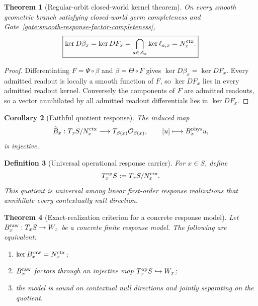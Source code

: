 \documentclass[11pt]{article}
\newtheorem{theorem}{Theorem}[section]
\newtheorem{corollary}[theorem]{Corollary}
\newtheorem{definition}[theorem]{Definition}
\theoremstyle{remark}
\begin{document}
\begin{theorem}[Regular-orbit closed-world kernel theorem]
\label{thm:regular-stratum-closed-world-kernel}
On every smooth geometric branch satisfying closed-world germ completeness and
Gate~\ref{gate:smooth-response-factor-completeness},
\[
\boxed{
\ker D\beta_x
=\ker DF_x
=\bigcap_{a\in\mathcal A_x}\ker\ell_{a,x}
=N_x^{\rm ctx}.}
\]
\end{theorem}

\begin{proof}
Differentiating $F=\Psi\circ\beta$ and $\beta=\Theta\circ F$ gives
$\ker D\beta_x=\ker DF_x$.  Every admitted readout is locally a smooth
function of $F$, so $\ker DF_x$ lies in every admitted readout kernel.
Conversely the components of $F$ are admitted readouts, so a vector
annihilated by all admitted readout differentials lies in $\ker DF_x$.
\end{proof}

\begin{corollary}[Faithful quotient response]
\label{cor:faithful-quotient-response}
The induced map
\[
 \widetilde B_x:T_xS/N_x^{\rm ctx}
 \longrightarrow T_{\beta(x)}\mathcal O_{\beta(x)},
 \qquad [u]\longmapsto B_x^{\rm phys}u,
\]
is injective.
\end{corollary}

\begin{definition}[Universal operational response carrier]
\label{def:universal-operational-response-carrier}
For $x\in S$, define
\[
        T_x^{\rm op}S:=T_xS/N_x^{\rm ctx}.
\]
This quotient is universal among linear first-order response realizations that
annihilate every contextually null direction.
\end{definition}

\begin{theorem}[Exact-realization criterion for a concrete response model]
\label{thm:exact-realization-criterion}
Let $B_x^{\rm raw}:T_xS\to W_x$ be a concrete finite response model.  The
following are equivalent:
\begin{enumerate}[label=(\roman*)]
\item $\ker B_x^{\rm raw}=N_x^{\rm ctx}$;
\item $B_x^{\rm raw}$ factors through an injective map
$T_x^{\rm op}S\hookrightarrow W_x$;
\item the model is sound on contextual null directions and jointly separating
on the quotient.
\end{enumerate}
\end{theorem}
\end{document}
